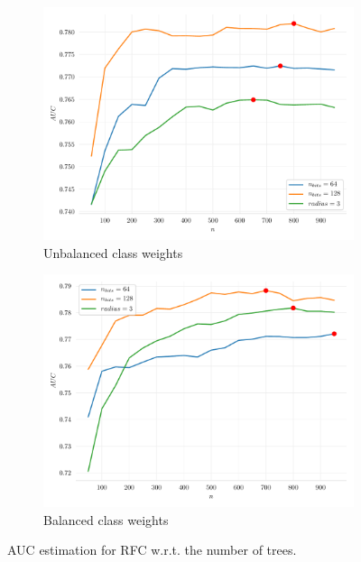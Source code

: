 \begin{figure}[h]
    \begin{subfigure}{0.49\textwidth}
        \centering
        \includegraphics[width=\textwidth]{resources/pdf/rfc-number-trees.pdf}
        \caption{Unbalanced class weights}
    \end{subfigure}
    \begin{subfigure}{0.49\textwidth}
        \centering
        \includegraphics[width=\textwidth]{resources/pdf/rfc-number-trees-balanced.pdf}
        \caption{Balanced class weights}
    \end{subfigure}
    \caption{AUC estimation for RFC w.r.t. the number of trees.}
    \label{fig:rfc}
\end{figure}

